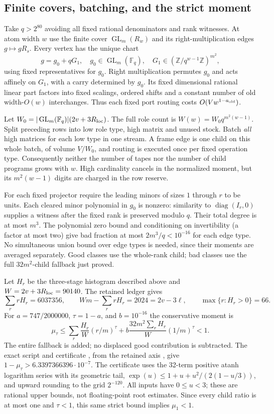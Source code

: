 \subsection{Finite covers, batching, and the strict moment}
Take $q>2^{80}$ avoiding all fixed rational denominators and rank witnesses.
At atom width $w$ use the finite cover $\operatorname{GL}_m(R_w)$ and its
right-multiplication edges $g\mapsto gR_s$. Every vertex has the unique chart
\[
 g=g_0+qG_1,\quad g_0\in\operatorname{GL}_m(\mathbb F_q),
 \quad G_1\in(\mathbb Z/q^{w-1}\mathbb Z)^{m^2},
\]
using fixed representatives for $g_0$. Right multiplication permutes $g_0$
and acts affinely on $G_1$, with a carry determined by $g_0$. Its fixed
dimensional rational linear part factors into fixed scalings, ordered
shifts and a constant number of old width-$O(w)$ interchanges. Thus each
fixed port routing costs $O(Vw^{1-a_{\rm old}})$.

Let $W_0=|\operatorname{GL}_m(\mathbb F_q)|(2v+3R_{\rm loc})$.
The full role count is $W(w)=W_0q^{m^2(w-1)}$. Split preceding rows into
low role type, high matrix and unused stock. Batch \emph{all} high matrices
for each low type in one stream. A frame edge is one child on this whole
batch, of volume $V/W_0$, and routing is executed once per fixed operation
type. Consequently neither the number of tapes nor the number of child
programs grows with $w$. High cardinality cancels in the normalized moment,
but its $m^2(w-1)$ digits are charged in the row reserve.

For each fixed projector require the leading minors of sizes $1$ through
$r$ to be units. Each cleared minor polynomial in $g_0$ is nonzero:
similarity to $\operatorname{diag}(I_r,0)$ supplies a witness after the
fixed rank is preserved modulo $q$. Their total degree is at most $m^3$.
The polynomial zero bound and conditioning on invertibility (a factor at
most two) give bad fraction at most $2m^3/q<10^{-16}$ for each edge type.
No simultaneous union bound over edge types is needed, since their moments
are averaged separately. Good classes use the whole-rank child; bad
classes use the full $32m^2$-child fallback just proved.

Let $H_r$ be the three-stage histogram described above and
$W=2v+3R_{\rm loc}=90140$. The retained ledger gives
\[
 \sum_r rH_r=6037356,\qquad Wm-\sum_r rH_r=2024=2v-3\ell,
 \qquad \max\{r:H_r>0\}=66.
\]
For $a=747/2000000$, $\tau=1-a$, and $b=10^{-16}$ the conservative moment is
\[
 \mu_\tau\le
 \sum_r\frac{H_r}{W}(r/m)^\tau+
 b\frac{32m^2\sum_rH_r}{W}(1/m)^\tau<1.
\]
The entire fallback is added; no displaced good contribution is subtracted.
The exact script  and certificate
, from the retained axis
, give
$1-\mu_\tau>6.3397366396\cdot10^{-7}$.
The certificate uses the 32-term positive atanh logarithm series with its
geometric tail, $\exp(u)\le1+u+u^2/(2(1-u/3))$, and upward rounding to
the grid $2^{-120}$. All inputs have $0\le u<3$; these are rational upper
bounds, not floating-point root estimates. Since every child ratio is at
most one and $\tau<1$, this same strict bound implies $\mu_1<1$.

